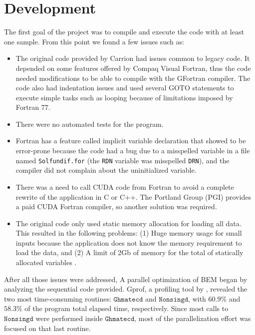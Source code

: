 \chapter{Development}
\label{cap:dev}

The first goal of the project was to compile and execute the code with at least one sample. 
From this point we found a few issues such as:

\begin{itemize}
\item The original code provided by Carrion had issues common to legacy code. 
It depended on some features offered by Compaq Visual Fortran, thus the code needed 
modifications to be able to compile with the GFortran compiler. The code also had 
indentation issues and used several GOTO statements to execute simple tasks such 
as looping because of limitations imposed by Fortran 77.

\item There were no automated tests for the program.

\item Fortran has a feature called implicit variable declaration that showed to be 
error-prone because the code had a bug due to a misspelled variable in a file 
named \texttt{Solfundif.for} (the \texttt{RDN} variable was misspelled \texttt{DRN}),
and the compiler did not complain about the uninitialized variable.

\item There was a need to call CUDA code from Fortran to avoid a complete rewrite of the 
application in C or C++. The Portland Group (PGI) provides a paid CUDA Fortran compiler,
so another solution was required.

\item The original code only used static memory allocation for loading all data. 
This resulted in the following problems: (1) Huge memory usage for small inputs because the 
application does not know the memory requirement to load the data, and (2) A limit of 2Gb of 
memory for the total of statically allocated variables \cite{intel_mcmodel:2010}. 

\end{itemize}


After all those issues were addressed, A parallel optimization of BEM began by analyzing the sequential code provided. 
Gprof, a profiling tool by \cite{binutils}, revealed the two most time-consuming routines: 
$\texttt{Ghmatecd}$ and $\texttt{Nonsingd}$, with $60.9\%$ and $58.3\%$ of the program total 
elapsed time, respectively.
Since most calls to $\texttt{Nonsingd}$ were performed inside $\texttt{Ghmatecd}$, most
of the parallelization effort was focused 
on that last routine.


